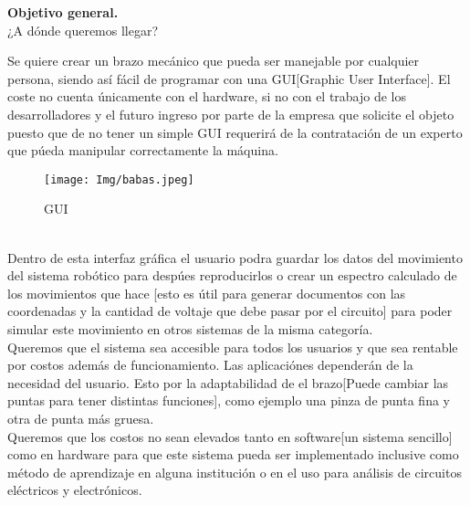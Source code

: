 \documentclass[letterpaper]{article}
\begin{document}
\begin{large}
    \begin{LARGE}
        \textbf{Objetivo general.}\\
       
       
        ¿A dónde queremos llegar?\\
     
         
    \end{LARGE}
        Se quiere crear un brazo mecánico que pueda ser manejable por cualquier persona, siendo así fácil de programar con una GUI[Graphic User Interface]. El coste no cuenta únicamente con el hardware, si no con el trabajo de los desarrolladores y el futuro ingreso por parte de la empresa que solicite el objeto puesto que de no tener un simple GUI requerirá de la contratación de un experto que púeda manipular correctamente la máquina.\\
 \vspace{.6cm}
        \begin{figure}[htbp]
            \centering
            \texttt{[image: Img/babas.jpeg]}
            \caption{GUI}
            \label{fig:gui}
        \end{figure}\\
    Dentro de esta interfaz gráfica el usuario podra guardar los datos del movimiento del sistema robótico para despúes reproducirlos o crear un espectro calculado de los movimientos que hace [esto es útil para generar documentos con las coordenadas y la cantidad de voltaje que debe pasar por el circuito] para poder simular este movimiento en otros sistemas de la misma categoría. \\
    Queremos que el sistema sea accesible para todos los usuarios y que sea rentable por costos además de funcionamiento. Las aplicaciónes dependerán de la necesidad del usuario. Esto por la adaptabilidad de el brazo[Puede cambiar las puntas para tener distintas funciones], como ejemplo una pinza de punta fina y otra de punta más gruesa.\\
    Queremos que los costos no sean elevados tanto en software[un sistema sencillo] como en hardware  para que este sistema pueda ser implementado inclusive como método de aprendizaje en alguna institución o en el uso para análisis de circuitos eléctricos y electrónicos.\\\\
        
\end{large}
\end{document}
